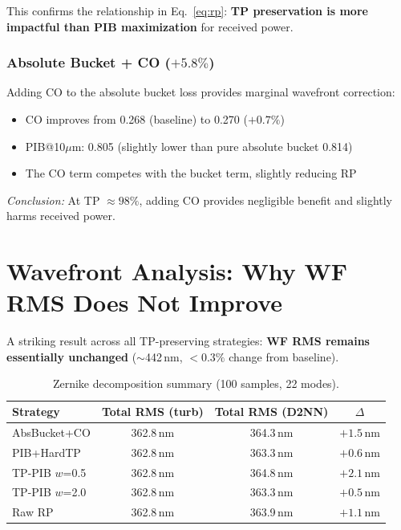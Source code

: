 \documentclass[11pt,a4paper]{article}
\begin{document}
This confirms the relationship in Eq.~\ref{eq:rp}: \textbf{TP preservation is more impactful than PIB maximization} for received power.

\subsubsection{Absolute Bucket + CO ($+5.8\%$)}

Adding CO to the absolute bucket loss provides marginal wavefront correction:
\begin{itemize}[nosep]
\item CO improves from 0.268 (baseline) to 0.270 ($+0.7\%$)
\item PIB@10$\mu$m: 0.805 (slightly lower than pure absolute bucket 0.814)
\item The CO term competes with the bucket term, slightly reducing RP
\end{itemize}

\textit{Conclusion:} At TP $\approx 98\%$, adding CO provides negligible benefit and slightly harms received power.

\section{Wavefront Analysis: Why WF RMS Does Not Improve}
\label{sec:wf}

A striking result across all TP-preserving strategies: \textbf{WF RMS remains essentially unchanged} ($\sim$442\,nm, $<0.3\%$ change from baseline).

\begin{table}[H]
\centering
\caption{Zernike decomposition summary (100 samples, 22 modes).}
\begin{tabular}{l c c c}
\toprule
Strategy & Total RMS (turb) & Total RMS (D2NN) & $\Delta$ \\
\midrule
AbsBucket+CO & 362.8\,nm & 364.3\,nm & $+1.5$\,nm \\
PIB+HardTP & 362.8\,nm & 363.3\,nm & $+0.6$\,nm \\
TP-PIB $w$=0.5 & 362.8\,nm & 364.8\,nm & $+2.1$\,nm \\
TP-PIB $w$=2.0 & 362.8\,nm & 363.3\,nm & $+0.5$\,nm \\
Raw RP & 362.8\,nm & 363.9\,nm & $+1.1$\,nm \\
\bottomrule
\end{tabular}
\end{table}
\end{document}
